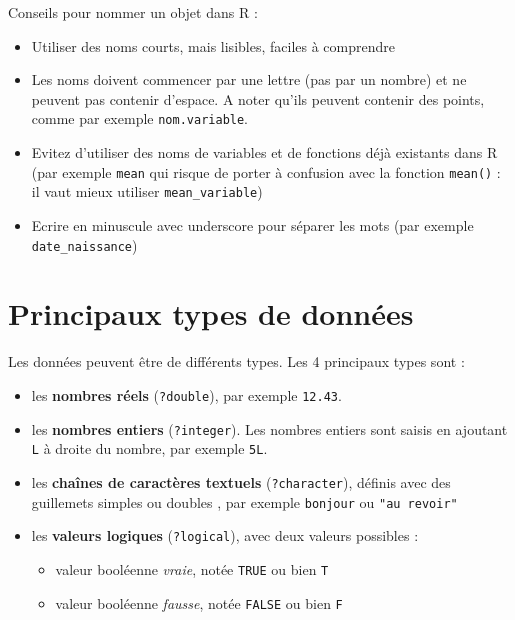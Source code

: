 \documentclass[
]{book}
\providecommand{\tightlist}{%
  \setlength{\itemsep}{0pt}\setlength{\parskip}{0pt}}
\begin{document}
Conseils pour nommer un objet dans R :

\begin{itemize}
\tightlist
\item
  Utiliser des noms courts, mais lisibles, faciles à comprendre
\item
  Les noms doivent commencer par une lettre (pas par un nombre) et ne peuvent pas contenir d'espace. A noter qu'ils peuvent contenir des points, comme par exemple \texttt{nom.variable}.
\item
  Evitez d'utiliser des noms de variables et de fonctions déjà existants dans R (par exemple \texttt{mean} qui risque de porter à confusion avec la fonction \texttt{mean()} : il vaut mieux utiliser \texttt{mean\_variable})
\item
  Ecrire en minuscule avec underscore pour séparer les mots (par exemple \texttt{date\_naissance})
\end{itemize}

\section{Principaux types de données}\label{principaux-types-de-donnuxe9es}

Les données peuvent être de différents types. Les 4 principaux types sont :

\begin{itemize}
\tightlist
\item
  les \textbf{nombres réels} (\texttt{?double}), par exemple \texttt{12.43}.
\item
  les \textbf{nombres entiers} (\texttt{?integer}). Les nombres entiers sont saisis en ajoutant \texttt{L} à droite du nombre, par exemple \texttt{5L}.
\item
  les \textbf{chaînes de caractères textuels} (\texttt{?character}), définis avec des guillemets simples ou doubles , par exemple \texttt{\textquotesingle{}bonjour\textquotesingle{}} ou \texttt{"au\ revoir"}
\item
  les \textbf{valeurs logiques} (\texttt{?logical}), avec deux valeurs possibles :

  \begin{itemize}
  \tightlist
  \item
    valeur booléenne \emph{vraie}, notée \texttt{TRUE} ou bien \texttt{T}
  \item
    valeur booléenne \emph{fausse}, notée \texttt{FALSE} ou bien \texttt{F}
  \end{itemize}
\end{itemize}
\end{document}
